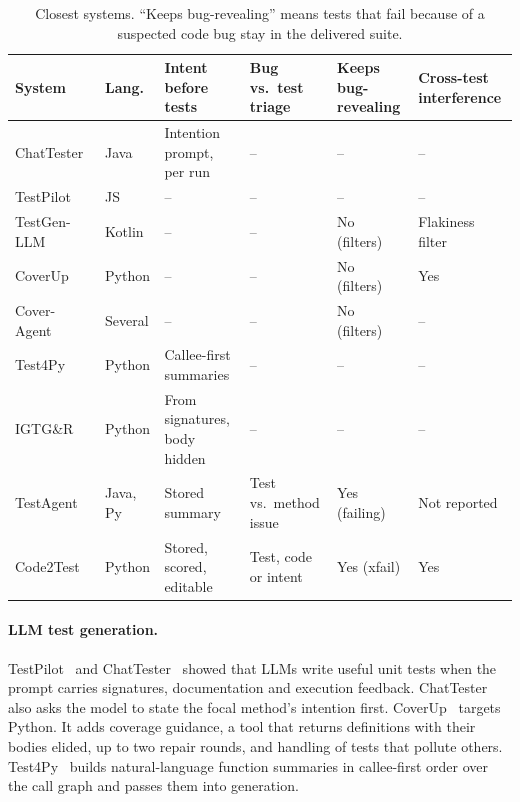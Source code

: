 \documentclass[11pt]{article}
\newcommand{\toolname}{Code2Test}
\begin{document}
\begin{table}[t]
\centering
\small
\caption{Closest systems. ``Keeps bug-revealing'' means tests that fail because of a suspected code bug stay in the delivered suite.}
\label{tab:related}
\begin{tabularx}{\linewidth}{@{}l l L L L L@{}}
\toprule
System & Lang. & Intent before tests & Bug vs.\ test triage & Keeps bug-revealing & Cross-test interference \\
\midrule
ChatTester~\cite{yuan2024chattester} & Java & Intention prompt, per run & -- & -- & -- \\
TestPilot~\cite{schafer2024testpilot} & JS & -- & -- & -- & -- \\
TestGen-LLM~\cite{alshahwan2024testgenllm} & Kotlin & -- & -- & No (filters) & Flakiness filter \\
CoverUp~\cite{pizzorno2025coverup} & Python & -- & -- & No (filters) & Yes \\
Cover-Agent~\cite{qodo2024coveragent} & Several & -- & -- & No (filters) & -- \\
Test4Py~\cite{liu2025test4py} & Python & Callee-first summaries & -- & -- & -- \\
IGTG\&R~\cite{liu2026igtgr} & Python & From signatures, body hidden & -- & -- & -- \\
TestAgent~\cite{zhang2026testagent} & Java, Py & Stored summary & Test vs.\ method issue & Yes (failing) & Not reported \\
\midrule
\toolname{} & Python & Stored, scored, editable & Test, code or intent & Yes (xfail) & Yes \\
\bottomrule
\end{tabularx}
\end{table}

\paragraph{LLM test generation.}
TestPilot~\cite{schafer2024testpilot} and ChatTester~\cite{yuan2024chattester} showed that LLMs write useful unit tests when the prompt carries signatures, documentation and execution feedback.
ChatTester also asks the model to state the focal method's intention first.
CoverUp~\cite{pizzorno2025coverup} targets Python.
It adds coverage guidance, a tool that returns definitions with their bodies elided, up to two repair rounds, and handling of tests that pollute others.
Test4Py~\cite{liu2025test4py} builds natural-language function summaries in callee-first order over the call graph and passes them into generation.
\end{document}
